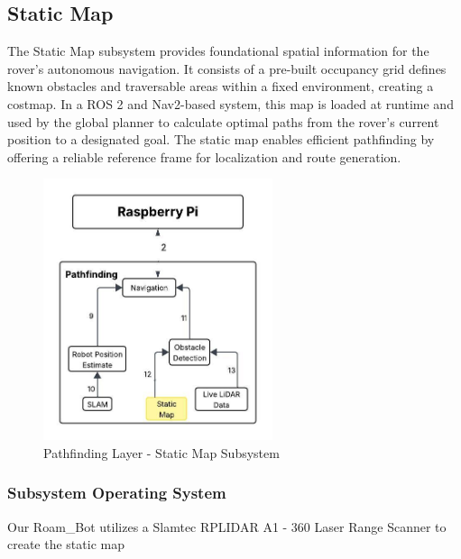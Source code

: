 \newpage

\subsection{Static Map}
The Static Map subsystem provides foundational spatial information for the rover's autonomous navigation. It consists of a pre-built occupancy grid defines known obstacles and traversable areas within a fixed environment, creating a costmap. In a ROS 2 and Nav2-based system, this map is loaded at runtime and used by the global planner to calculate optimal paths from the rover's current position to a designated goal. The static map enables efficient pathfinding by offering a reliable reference frame for localization and route generation.

\begin{figure}[h!]
	\centering
 	\includegraphics[width=0.60\textwidth]{images/pathfinding2nd/Data_Flow_StaticMap.jpeg}
 \caption{Pathfinding Layer - Static Map Subsystem}
\end{figure}


\subsubsection{Subsystem Operating System}
Our Roam\_Bot utilizes a Slamtec RPLIDAR A1 - 360 Laser Range Scanner to create the static map
